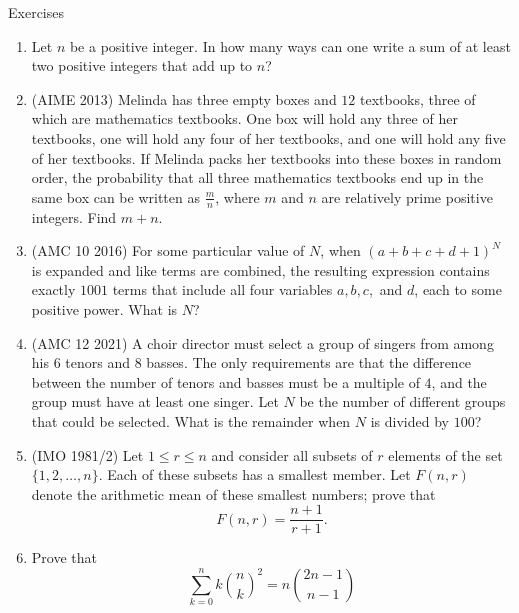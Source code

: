 \begin{xcb}{Exercises}
\begin{enumerate}
\begin{hint}
\end{hint}
\item {} Let $n$ be a positive integer. In how many ways can one write a sum of at least two positive integers that add up to $n$?
\item (AIME 2013)  Melinda has three empty boxes and $12$ textbooks, three of which are mathematics textbooks. One box will hold any three of her textbooks, one will hold any four of her textbooks, and one will hold any five of her textbooks. If Melinda packs her textbooks into these boxes in random order, the probability that all three mathematics textbooks end up in the same box can be written as $\frac{m}{n}$, where $m$ and $n$ are relatively prime positive integers. Find $m+n$.
\begin{hint}
\end{hint}
\item (AMC 10 2016)  For some particular value of $N$, when $(a + b + c + d + 1)^N$ is expanded and like terms are combined, the resulting expression contains exactly $1001$ terms that include all four variables $a, b, c,$ and $d$, each to some positive power. What is $N$?
\item (AMC 12 2021)  A choir director must select a group of singers from among his $6$ tenors and $8$ basses. The only requirements are that the difference between the number of tenors and basses must be a multiple of $4$, and the group must have at least one singer. Let $N$ be the number of different groups that could be selected. What is the remainder when $N$ is divided by $100$?
\begin{hint}
\end{hint}
\item (IMO 1981/2)  Let $\displaystyle 1 \le r \le n$ and consider all subsets of $\displaystyle r$ elements of the set $\{ 1, 2, \ldots , n \}$. Each of these subsets has a smallest member. Let $\displaystyle F(n,r)$ denote the arithmetic mean of these smallest numbers; prove that\\
\[F(n,r) = \frac{n+1}{r+1}.\]
\begin{hint}
\end{hint}
\item {} Prove that \[\sum_{k=0}^n k{\binom{n}{k}}^2=n\binom{2n-1}{n-1}\]
\end{enumerate}
\end{xcb}